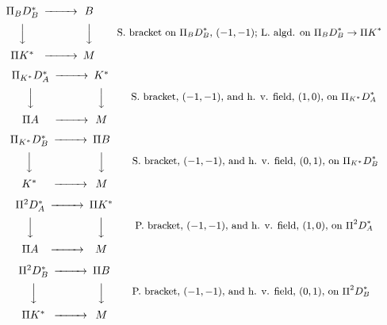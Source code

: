 \documentclass[12pt,reqno,a4paper]{amsart}
\theoremstyle{definition}
\begin{document}
\begin{equation} \label{eq.dv11}
    \begin{CD} \Pi_{B}D^{*}_{B}@>>>   B\\
                @VVV  @VVV \\
               \Pi K^*@>>>M
    \end{CD} \qquad \text{\small S. bracket on $\Pi_BD^{*}_{B}$, $(-1,-1)$; L. algd. on $\Pi_BD^{*}_{B}\to \Pi K^*$}
\end{equation}

\begin{equation} \label{eq.piduala}
    \begin{CD} \Pi_{K^*}D^{*}_{A}@>>>   K^*\\
                @VVV  @VVV \\
                \Pi A@>>>M
    \end{CD} \qquad \text{\small S. bracket, $(-1,-1)$, and h. v. field, $(1,0)$, on $\Pi_{K^*}D^{*}_{A}$}
\end{equation}

\begin{equation} \label{eq.pidualb}
    \begin{CD} \Pi_{K^*}D^{*}_{B}@>>>  \Pi B\\
                @VVV  @VVV \\
                K^*@>>>M
    \end{CD} \qquad \text{\small S. bracket, $(-1,-1)$, and h. v. field, $(0,1)$, on $\Pi_{K^*}D^{*}_{B}$}
\end{equation}

\begin{equation} \label{eq.pikvadratduala}
    \begin{CD} \Pi^2 D^{*}_{A}@>>>   \Pi K^*\\
                @VVV  @VVV \\
                \Pi A@>>>M
    \end{CD} \qquad \text{\small P. bracket, $(-1,-1)$, and h. v. field, $(1,0)$, on $\Pi^2 D^{*}_{A}$}
\end{equation}

\begin{equation} \label{eq.pikvadratdualb}
    \begin{CD} \Pi^2 D^{*}_{B}@>>>   \Pi B\\
                @VVV  @VVV \\
                \Pi K^*@>>>M
    \end{CD} \qquad \text{\small P. bracket, $(-1,-1)$, and h. v. field, $(0,1)$, on $\Pi^2 D^{*}_{B}$}
\end{equation}
\end{document}
